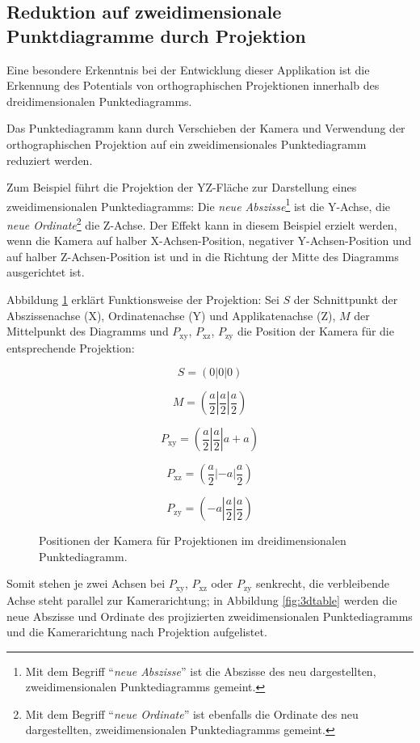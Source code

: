 \subsection{Reduktion auf zweidimensionale Punktdiagramme durch Projektion}

Eine besondere Erkenntnis bei der Entwicklung dieser Applikation ist die Erkennung des Potentials von orthographischen Projektionen innerhalb des dreidimensionalen Punktediagramms.

Das Punktediagramm kann durch Verschieben der Kamera und Verwendung der orthographischen Projektion auf ein zweidimensionales Punktediagramm reduziert werden.

Zum Beispiel führt die Projektion der YZ-Fläche zur Darstellung eines zweidimensionalen Punktediagramms: Die \textit{neue Abszisse}\footnote{Mit dem Begriff "`\textit{neue Abszisse}"' ist die Abszisse des neu dargestellten, zweidimensionalen Punktediagramms gemeint.} ist die Y-Achse, die \textit{neue Ordinate}\footnote{Mit dem Begriff "`\textit{neue Ordinate}"' ist ebenfalls die Ordinate des neu dargestellten, zweidimensionalen Punktediagramms gemeint.} die Z-Achse. Der Effekt kann in diesem Beispiel erzielt werden, wenn die Kamera auf halber X-Achsen-Position, negativer Y-Achsen-Position und auf halber Z-Achsen-Position ist und in die Richtung der Mitte des Diagramms ausgerichtet ist.

Abbildung \ref{fig:3dmath} erklärt Funktionsweise der Projektion: Sei $S$ der Schnittpunkt der Abszissenachse (X), Ordinatenachse (Y) und Applikatenachse (Z), $M$ der Mittelpunkt des Diagramms und $P_{\text{xy}}$, $P_{\text{xz}}$, $P_{\text{zy}}$ die Position der Kamera für die entsprechende Projektion:

\begin{figure}[H]
$$S = (0|0|0)$$

$$M = (\frac{a}{2} | \frac{a}{2} | \frac{a}{2})$$

$$P_{\text{xy}} = (\frac{a}{2} | \frac{a}{2}| a + a)$$

$$P_{\text{xz}} = (\frac{a}{2} | -a | \frac{a}{2})$$

$$P_{\text{zy}} = (-a | \frac{a}{2}| \frac{a}{2})$$

\caption{Positionen der Kamera für Projektionen im dreidimensionalen Punktediagramm.}
\label{fig:3dmath}
\end{figure}

Somit stehen je zwei Achsen bei $P_{\text{xy}}$, $P_{\text{xz}}$ oder $P_{\text{zy}}$ senkrecht, die verbleibende Achse steht parallel zur Kamerarichtung; in Abbildung \ref{fig:3dtable} werden die neue Abszisse und Ordinate des projizierten zweidimensionalen Punktediagramms und die Kamerarichtung nach Projektion aufgelistet.

